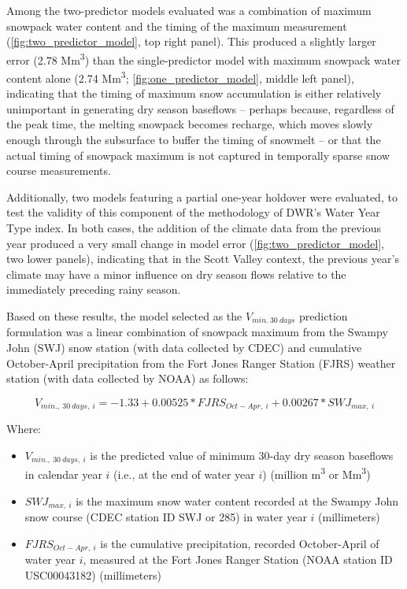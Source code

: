 \documentclass[hess, manuscript]{copernicus}
\providecommand{\tightlist}{%
  \setlength{\itemsep}{0pt}\setlength{\parskip}{0pt}}
\begin{document}
Among the two-predictor models evaluated was a combination of maximum
snowpack water content and the timing of the maximum measurement
(\autoref{fig:two_predictor_model}, top right panel). This produced a
slightly larger error (2.78 Mm\textsuperscript{3}) than the
single-predictor model with maximum snowpack water content alone (2.74
Mm\textsuperscript{3}; \autoref{fig:one_predictor_model}, middle left
panel), indicating that the timing of maximum snow accumulation is
either relatively unimportant in generating dry season baseflows --
perhaps because, regardless of the peak time, the melting snowpack
becomes recharge, which moves slowly enough through the subsurface to
buffer the timing of snowmelt -- or that the actual timing of snowpack
maximum is not captured in temporally sparse snow course measurements.

Additionally, two models featuring a partial one-year holdover were
evaluated, to test the validity of this component of the methodology of
DWR's Water Year Type index. In both cases, the addition of the climate
data from the previous year produced a very small change in model error
(\autoref{fig:two_predictor_model}, two lower panels), indicating that
in the Scott Valley context, the previous year's climate may have a
minor influence on dry season flows relative to the immediately
preceding rainy season.

Based on these results, the model selected as the \(V_{min.~30~days}\)
prediction formulation was a linear combination of snowpack maximum from
the Swampy John (SWJ) snow station (with data collected by CDEC) and
cumulative October-April precipitation from the Fort Jones Ranger
Station (FJRS) weather station (with data collected by NOAA) as follows:

\[V_{min.,~30~days,~i} = -1.33 + 0.00525 * FJRS_{Oct-Apr,~i}+0.00267*SWJ_{max,~i}\]

Where:

\begin{itemize}
\tightlist
\item
  \(V_{min.,~30~days,~i}\) is the predicted value of minimum 30-day dry
  season baseflows in calendar year \(i\) (i.e., at the end of water
  year \(i\)) (million m\textsuperscript{3} or Mm\textsuperscript{3})
\item
  \(SWJ_{max,~i}\) is the maximum snow water content recorded at the
  Swampy John snow course (CDEC station ID SWJ or 285) in water year
  \(i\) (millimeters)
\item
  \(FJRS_{Oct-Apr,~i}\) is the cumulative precipitation, recorded
  October-April of water year \(i\), measured at the Fort Jones Ranger
  Station (NOAA station ID USC00043182) (millimeters)
\end{itemize}
\end{document}
